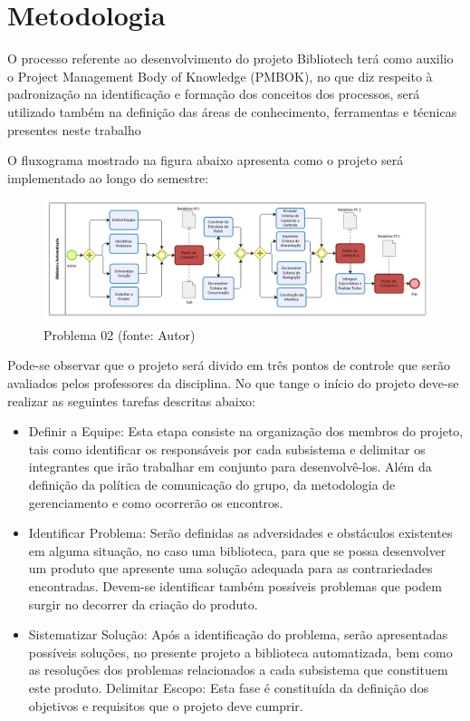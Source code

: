 \chapter[Metodologia] {Metodologia}

O processo referente ao desenvolvimento do projeto Bibliotech terá como auxilio o Project Management Body of Knowledge (PMBOK), no que diz respeito à padronização na identificação e formação dos conceitos dos processos, será utilizado também na definição das áreas de conhecimento, ferramentas e técnicas presentes neste trabalho \cite{pmbok2004}

O fluxograma mostrado na figura abaixo apresenta como o projeto será implementado ao longo do semestre: 

\begin{figure}[!h]
\centering
\includegraphics[scale=0.65, angle = 90]{figuras/fluxograma_metodologia}
\caption[]{Problema 02 (fonte: Autor)}
\label{Problema 02}
\end{figure}
\FloatBarrier

Pode-se observar que o projeto será divido em três pontos de controle que serão avaliados pelos professores da disciplina. No que tange o início do projeto deve-se realizar as seguintes tarefas descritas abaixo:

\begin{itemize}
\item Definir a Equipe: Esta etapa consiste na organização dos membros do projeto, tais como identificar os responsáveis por cada subsistema e delimitar os integrantes que irão trabalhar em conjunto para desenvolvê-los. Além da definição da política de comunicação do grupo, da metodologia de gerenciamento e como ocorrerão os encontros. 
\item Identificar Problema: Serão definidas as adversidades e obstáculos existentes em alguma situação, no caso uma biblioteca, para que se possa desenvolver um produto que apresente uma solução adequada para as contrariedades encontradas. Devem-se identificar também possíveis problemas que podem surgir no decorrer da criação do produto.
\item Sistematizar Solução: Após a identificação do problema, serão apresentadas possíveis soluções, no presente projeto a biblioteca automatizada, bem como as resoluções dos problemas relacionados a cada subsistema que constituem este produto.
Delimitar Escopo: Esta fase é constituída da definição dos objetivos e requisitos que o projeto deve cumprir.
\end{itemize}

